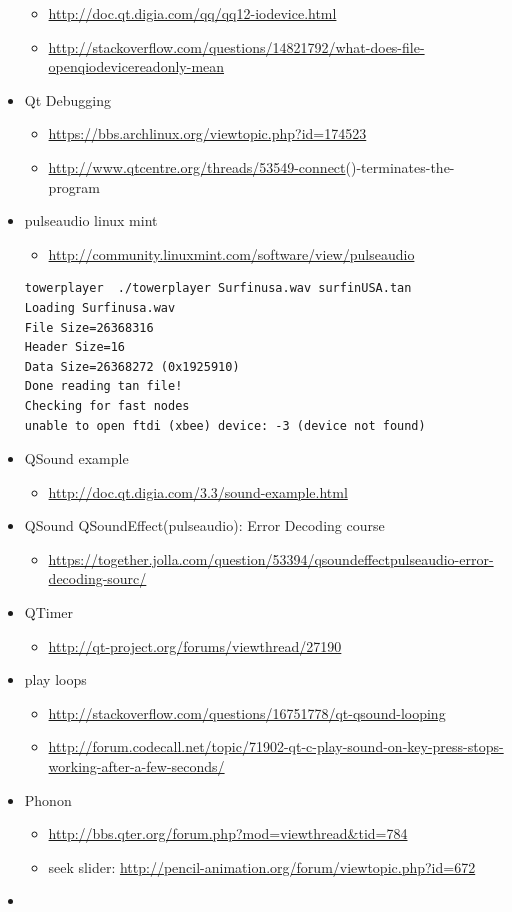 \documentclass[9pt,b5paper]{article}
\begin{document}
\begin{itemize}
\begin{itemize}
\item \url{http://doc.qt.digia.com/qq/qq12-iodevice.html}
\item \url{http://stackoverflow.com/questions/14821792/what-does-file-openqiodevicereadonly-mean}
\end{itemize}
\item Qt Debugging
\begin{itemize}
\item \url{https://bbs.archlinux.org/viewtopic.php?id=174523}
\item \url{http://www.qtcentre.org/threads/53549-connect}()-terminates-the-program
\end{itemize}
\item pulseaudio linux mint
\begin{itemize}
\item \url{http://community.linuxmint.com/software/view/pulseaudio}
\end{itemize}
\begin{verbatim}
towerplayer  ./towerplayer Surfinusa.wav surfinUSA.tan
Loading Surfinusa.wav
File Size=26368316
Header Size=16
Data Size=26368272 (0x1925910)
Done reading tan file!
Checking for fast nodes
unable to open ftdi (xbee) device: -3 (device not found)
\end{verbatim}
\item QSound example
\begin{itemize}
\item \url{http://doc.qt.digia.com/3.3/sound-example.html}
\end{itemize}
\item QSound QSoundEffect(pulseaudio): Error Decoding course  
\begin{itemize}
\item \url{https://together.jolla.com/question/53394/qsoundeffectpulseaudio-error-decoding-sourc/}
\end{itemize}
\item QTimer
\begin{itemize}
\item \url{http://qt-project.org/forums/viewthread/27190}
\end{itemize}
\item play loops
\begin{itemize}
\item \url{http://stackoverflow.com/questions/16751778/qt-qsound-looping}
\item \url{http://forum.codecall.net/topic/71902-qt-c-play-sound-on-key-press-stops-working-after-a-few-seconds/}
\end{itemize}
\item Phonon
\begin{itemize}
\item \url{http://bbs.qter.org/forum.php?mod=viewthread&tid=784}
\item seek slider: \url{http://pencil-animation.org/forum/viewtopic.php?id=672}
\end{itemize}
\item 
\end{itemize}
\end{document}
